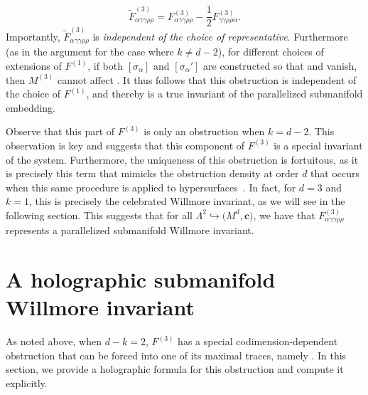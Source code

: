 \documentclass[10pt,a4paper]{article}
\numberwithin{equation}{section}
\newcommand{\cc}{\boldsymbol{c}}
\renewcommand{\=}{\stackrel \Lambda =}
\begin{document}
\[\tilde{F}^{(3)}_{\alpha \gamma \gamma \rho \rho} = F^{(3)}_{\alpha \gamma \gamma \rho \rho} - \frac{1}{2} F^{(3)}_{\gamma \gamma \rho \rho \alpha} .\]
Importantly, $\tilde{F}^{(3)}_{\alpha \gamma \gamma \rho \rho}$ is \textit{independent of the choice of representative}. Furthermore (as in the argument for the case where $k \neq d-2$), for different choices of extensions of $F^{(1)}$, if both $[\sigma_{\alpha}]$ and $[\sigma_{\alpha}']$ are constructed so that  and  vanish, then $M^{(3)}$ cannot affect . It thus follows that this obstruction is independent of the choice of $F^{(1)}$, and thereby is a true invariant of the parallelized submanifold embedding.

Observe that this part of $F^{(3)}$ is only an obstruction when $k=d-2$. This observation is key and suggests that this component of $F^{(3)}$ is a special invariant of the system. Furthermore, the uniqueness of this obstruction is fortuitous, as it is precisely this term that mimicks the obstruction density at order $d$ that occurs when this same procedure is applied to hypersurfaces~\cite{Will1}. In fact, for $d=3$ and $k=1$, this is precisely the celebrated Willmore invariant, as we will see in the following section. This suggests that for all $\Lambda^2 \hookrightarrow\bigl(M^d,\cc\bigr)$, we have that $F^{(3)}_{\alpha \gamma \gamma \rho \rho}$ represents a parallelized submanifold Willmore invariant.

\section{A holographic submanifold Willmore invariant} \label{Willmore-section}
As noted above, when $d-k=2$, $F^{(3)}$ has a special codimension-dependent obstruction that can be forced into one of its maximal traces, namely . In this section, we provide a holographic formula for this obstruction and compute it explicitly.
\end{document}
